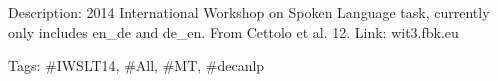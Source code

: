 Description\+: 2014 International Workshop on Spoken Language task, currently only includes en\+\_\+de and de\+\_\+en. From Cettolo et al. \textquotesingle{}12. Link\+: wit3.\+fbk.\+eu

Tags\+: \#\+I\+W\+S\+L\+T14, \#\+All, \#\+MT, \#decanlp 